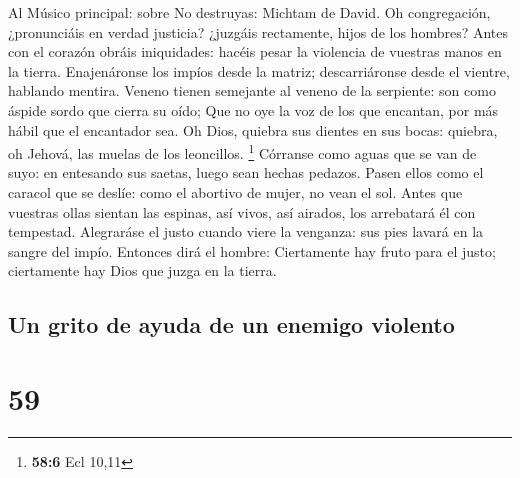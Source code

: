  Al Músico principal: sobre No destruyas: Michtam de David.
Oh congregación, ¿pronunciáis en verdad justicia? ¿juzgáis rectamente,
hijos de los hombres?  Antes con el corazón obráis
iniquidades: hacéis pesar la violencia de vuestras manos en la tierra.
 Enajenáronse los impíos desde la matriz; descarriáronse
desde el vientre, hablando mentira.  Veneno tienen semejante
al veneno de la serpiente: son como áspide sordo que cierra su oído;
 Que no oye la voz de los que encantan, por más hábil que el
encantador sea.  Oh Dios, quiebra sus dientes en sus bocas:
quiebra, oh Jehová, las muelas de los leoncillos. \footnote{\textbf{58:6}
  Ecl 10,11}  Córranse como aguas que se van de suyo: en
entesando sus saetas, luego sean hechas pedazos.  Pasen
ellos como el caracol que se deslíe: como el abortivo de mujer, no vean
el sol.  Antes que vuestras ollas sientan las espinas, así
vivos, así airados, los arrebatará él con tempestad. 
Alegraráse el justo cuando viere la venganza: sus pies lavará en la
sangre del impío.  Entonces dirá el hombre: Ciertamente hay
fruto para el justo; ciertamente hay Dios que juzga en la tierra.

\hypertarget{un-grito-de-ayuda-de-un-enemigo-violento}{%
\subsection{Un grito de ayuda de un enemigo
violento}\label{un-grito-de-ayuda-de-un-enemigo-violento}}

\hypertarget{section-58}{%
\section{59}\label{section-58}}

